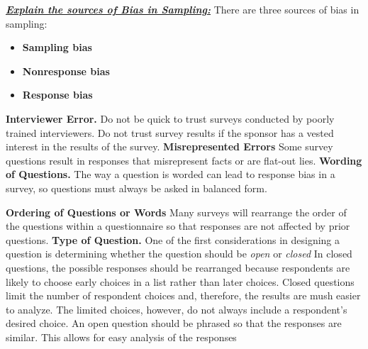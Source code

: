 \documentclass{report}
\begin{document}
        \bigbreak \noindent 
        \textbf{\textit{\underline{Explain the sources of Bias in Sampling:}}}
        \bigbreak \noindent 
        There are three sources of bias in sampling:
        \begin{itemize}
            \item \textbf{Sampling bias}
            \item \textbf{Nonresponse bias}
            \item \textbf{Response bias}
        \end{itemize}
        \bigbreak \noindent 
        \textbf{Interviewer Error.}
        \bigbreak \noindent 
        Do not be quick to trust surveys conducted by poorly trained interviewers. 
        \bigbreak \noindent 
        Do not trust survey results if the sponsor has a vested interest in the results of the survey.
        \bigbreak \noindent 
        \textbf{Misrepresented Errors}
        \bigbreak \noindent 
        Some survey questions result in responses that misrepresent facts or are flat-out lies.
        \bigbreak \noindent 
        \textbf{Wording of Questions.}
        \bigbreak \noindent 
        The way a question is worded can lead to response bias in a survey, so questions must always be asked in balanced form.

        \bigbreak \noindent 
        \textbf{Ordering of Questions or Words}
        \bigbreak \noindent 
        Many surveys will rearrange the order of the questions within a questionnaire so that responses are not affected by prior questions.
        \bigbreak \noindent 
        \textbf{Type of Question.}
        \bigbreak \noindent 
        One of the first considerations in designing a question is determining whether the question should be \textit{open} or \textit{closed}
        \bigbreak \noindent 
        In closed questions, the possible responses should be rearranged because respondents are likely to choose early choices in a list rather than later choices.
        \bigbreak \noindent 
        Closed questions limit the number of respondent choices and, therefore, the results are mush easier to analyze. The limited choices, however, do not always include a respondent's desired choice.
        \bigbreak \noindent 
        An open question should be phrased so that the responses are similar. This allows for easy analysis of the responses
        \bigbreak \noindent 
\end{document}
